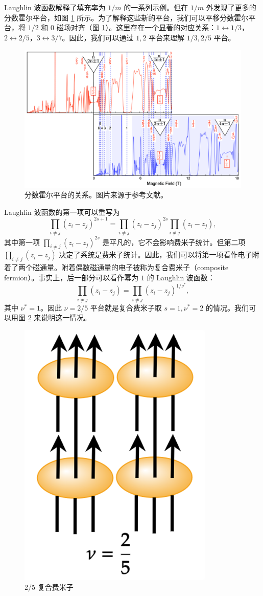 Laughlin 波函数解释了填充率为 $1/m$ 的一系列示例。但在 $1/m$ 外发现了更多的分数霍尔平台，如图 \ref{fig:plateau} 所示。为了解释这些新的平台，我们可以平移分数霍尔平台，将 $1/2$ 和 $0$ 磁场对齐（图 \ref{fig:plateau}）。这里存在一个显著的对应关系：$1\leftrightarrow1/3$，$2\leftrightarrow2/5$，$3\leftrightarrow3/7$。因此，我们可以通过 $1, 2$ 平台来理解 $1/3, 2/5$ 平台。

\begin{figure}[htbp]
    \centering
    \includegraphics[width=0.8\linewidth]{figure/Introduction/plateau.png}
    \caption{分数霍尔平台的关系。图片来源于参考文献\cite{jain2014note}。}
    \label{fig:plateau}
\end{figure}

Laughlin 波函数的第一项可以重写为
\begin{equation}
    \prod_{i \neq j}\left(z_i-z_j\right)^{2s+1} = \prod_{i \neq j}\left(z_i-z_j\right)^{2s} \prod_{i \neq j}\left(z_i-z_j\right),
\end{equation}
其中第一项 $\prod_{i \neq j}\left(z_i-z_j\right)^{2s}$ 是平凡的，它不会影响费米子统计。但第二项 $\prod_{i \neq j}\left(z_i-z_j\right)$ 决定了系统是费米子统计。因此，我们可以将第一项看作电子附着了两个磁通量。附着偶数磁通量的电子被称为复合费米子（composite fermion）\cite{jain1989composite}。事实上，后一部分可以看作幂为 $1$ 的 Laughlin 波函数：
\begin{equation}
    \prod_{i \neq j}\left(z_i-z_j\right) = \prod_{i \neq j}\left(z_i-z_j\right)^{1/\nu^*},
\end{equation}
其中 $\nu^*=1$。因此 $\nu=2/5$ 平台就是复合费米子取 $s=1, \nu^*=2$ 的情况。我们可以用图 \ref{fig:CF} 来说明这一情况。
\begin{figure}[htbp]
    \centering
    \includegraphics[width=0.25\linewidth]{figure/Introduction/CompositeFermions.png}
    \caption{2/5 复合费米子}
    \label{fig:CF}
\end{figure}

